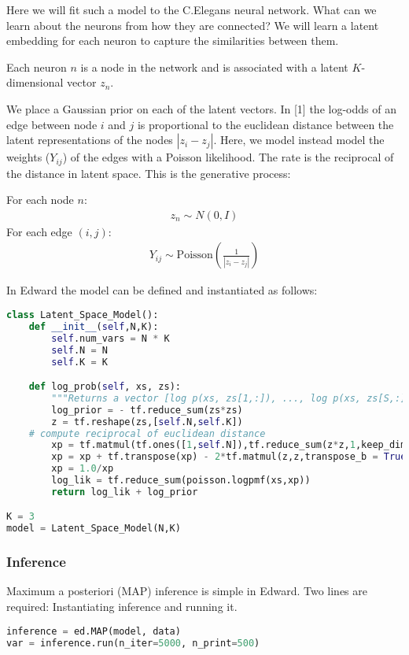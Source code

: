 Here we will fit such a model to the C.Elegans neural network. What can we learn about the neurons from how they are connected? We will learn a latent embedding for each neuron to capture the similarities between them.

Each neuron $n$ is a node in the network and is associated with a latent $K$-dimensional vector $z_n$.

We place a Gaussian prior on each of the latent vectors.
In [1] the log-odds of an edge between node $i$ and $j$ is proportional to the euclidean distance between the latent representations of the nodes $|z_i- z_j|$. Here, we model instead model the weights ($Y_{ij}$) of the edges with a Poisson likelihood. The rate is the reciprocal of the distance in latent space. This is the generative process:

For each node $n$:
\begin{align}
z_n \sim N(0,I)
\end{align}
For each edge $(i,j)$:
\begin{align}
Y_{ij} \sim \text{Poisson}(\frac{1}{|z_i - z_j|})
\end{align}

In Edward the model can be defined and instantiated as follows:
\begin{lstlisting}[language=Python]
class Latent_Space_Model():
    def __init__(self,N,K):
        self.num_vars = N * K
        self.N = N
        self.K = K

    def log_prob(self, xs, zs):
        """Returns a vector [log p(xs, zs[1,:]), ..., log p(xs, zs[S,:])]."""
        log_prior = - tf.reduce_sum(zs*zs)
        z = tf.reshape(zs,[self.N,self.K])
	# compute reciprocal of euclidean distance
        xp = tf.matmul(tf.ones([1,self.N]),tf.reduce_sum(z*z,1,keep_dims=True))
        xp = xp + tf.transpose(xp) - 2*tf.matmul(z,z,transpose_b = True)
        xp = 1.0/xp
        log_lik = tf.reduce_sum(poisson.logpmf(xs,xp))
        return log_lik + log_prior

K = 3
model = Latent_Space_Model(N,K)
\end{lstlisting}

\subsubsection{Inference}

Maximum a posteriori (MAP) inference is simple in Edward. Two lines are required: Instantiating inference and running it.
\begin{lstlisting}[language=Python]
inference = ed.MAP(model, data)
var = inference.run(n_iter=5000, n_print=500)
\end{lstlisting}

